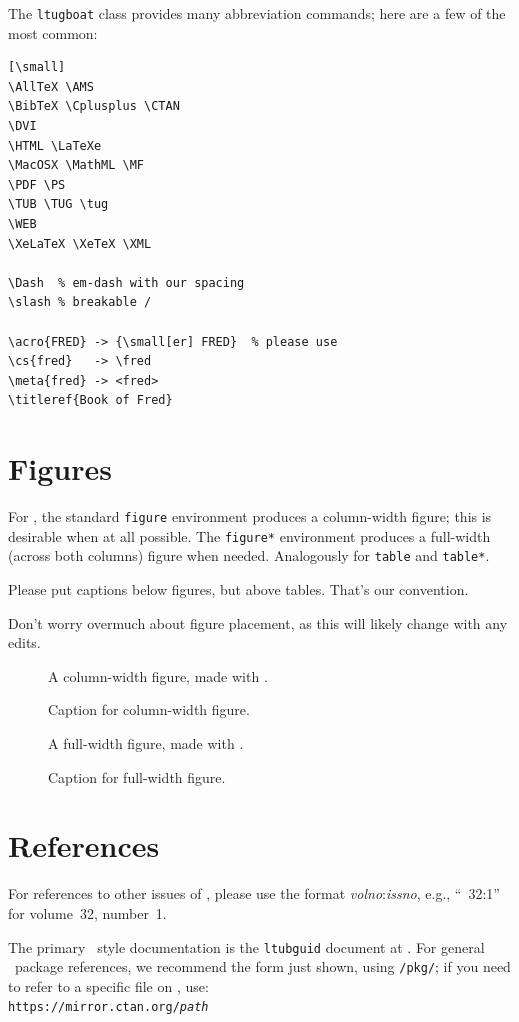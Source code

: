 \documentclass{ltugboat}
\begin{document}
The \texttt{ltugboat} class provides many abbreviation commands; here
are a few of the most common:

\begin{verbatim}[\small]
\AllTeX \AMS
\BibTeX \Cplusplus \CTAN
\DVI
\HTML \LaTeXe
\MacOSX \MathML \MF
\PDF \PS
\TUB \TUG \tug
\WEB
\XeLaTeX \XeTeX \XML

\Dash  % em-dash with our spacing
\slash % breakable /

\acro{FRED} -> {\small[er] FRED}  % please use
\cs{fred}   -> \fred
\meta{fred} -> <fred>
\titleref{Book of Fred}
\end{verbatim}

\section{Figures}

For \TUB, the standard \texttt{figure} environment produces a
column-width figure; this is desirable when at all possible. The
\texttt{figure*} environment produces a full-width (across both columns)
figure when needed. Analogously for \texttt{table} and \texttt{table*}.

Please put captions below figures, but above tables. That's our
convention.

Don't worry overmuch about figure placement, as this will likely change
with any edits.

\begin{figure}
A column-width figure, made with .
\caption{Caption for column-width figure.}
\label{fig.colwidth}
\end{figure}

\begin{figure}
A full-width figure, made with .
\caption{Caption for full-width figure.}
\label{fig.fullwidth}
\end{figure}

\section{References}

For references to other issues of \TUB, please use the format
\textsl{volno}:\textsl{issno}, e.g., ``\TUB\ 32:1'' for volume~32,
number~1.

The primary \TUB\ style documentation is the \texttt{ltubguid} document
at . For general \CTAN\ package references,
we recommend the form just shown, using \texttt{/pkg/}; if you need to
refer to a specific file on \CTAN, use:\\
\texttt{https://mirror.ctan.org/\textsl{path}}
\end{document}
